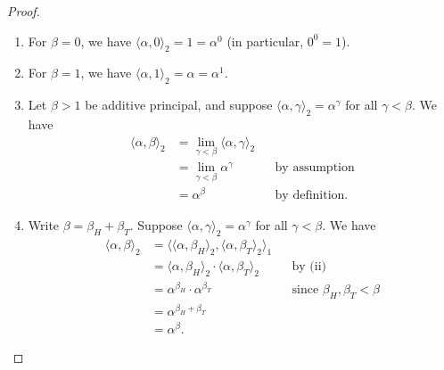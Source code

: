 \documentclass[10pt,a4paper]{amsart}
\newcommand{\op}[2]{\langle#1, #2\rangle}
\begin{document}
\begin{proof}
\begin{enumerate}
\begin{enumerate}
            \item[(1)] For $\beta = 0$, we have $\op\alpha0_2 = 1 = \alpha^0$ (in particular, $0^0 = 1$).
            \item[(2)] For $\beta = 1$, we have $\op\alpha1_2 = \alpha = \alpha^1$.
            \item[(3)] Let $\beta > 1$ be additive principal, and suppose $\op\alpha\gamma_2 = \alpha^\gamma$ for all $\gamma < \beta$. We have
                \begin{align*}
                    \op\alpha\beta_2 &= \textstyle\lim_{\gamma < \beta} {\op\alpha\gamma_2} && \\
                    &= \textstyle\lim_{\gamma < \beta} \alpha^\gamma && \text{by assumption} \\
                    &= \alpha^\beta && \text{by definition.}
                \end{align*}
            \item[(4)] Write $\beta = \beta_H + \beta_T$. Suppose $\op\alpha\gamma_2 = \alpha^\gamma$ for all $\gamma < \beta$. We have
                \begin{align*}
                    \op\alpha\beta_2 &= \op{\op\alpha{\beta_H}_2}{\op\alpha{\beta_T}_2}_1 && \\
                    &= \op\alpha{\beta_H}_2 \cdot \op\alpha{\beta_T}_2 && \text{by (ii)} \\
                    &= \alpha^{\beta_H} \cdot \alpha^{\beta_T} && \text{since } \beta_H, \beta_T < \beta \\
                    &= \alpha^{\beta_H + \beta_T} && \\
                    &= \alpha^\beta. &&
                \end{align*}
        \end{enumerate}
    \end{enumerate}
\end{proof}
\end{document}
